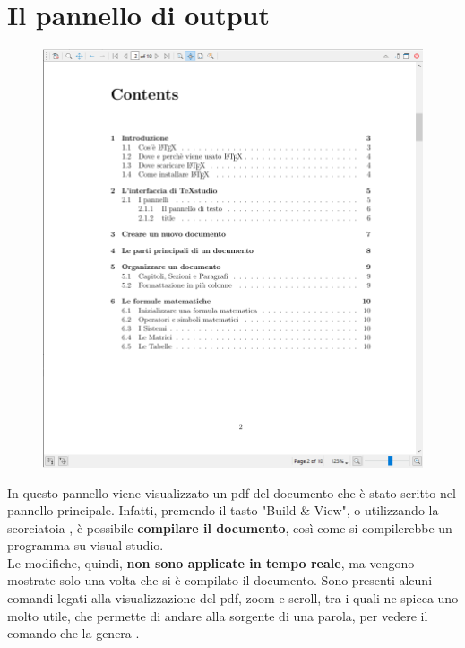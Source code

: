 \documentclass[12pt, oneside, openany, a4paper]{book}
\begin{document}
		\section{Il pannello di output}
		\begin{figure}[h]
			\includegraphics[width=\textwidth]{Chap2/OutputPanel.png}
		\end{figure}
		\noindent In questo pannello viene visualizzato un pdf del documento che è stato scritto nel pannello principale. Infatti, premendo il tasto "Build \& View", o utilizzando la scorciatoia 
		, è possibile \textbf{compilare il documento}, così come si compilerebbe un programma su visual studio.\\
		Le modifiche, quindi, \textbf{non sono applicate in tempo reale}, ma vengono mostrate solo una volta che si è compilato il documento. Sono presenti alcuni comandi legati alla visualizzazione del pdf, zoom e scroll, tra i quali ne spicca uno molto utile, che permette di andare alla sorgente di una parola, per vedere il comando che la genera .
		\newpage
		
\end{document}
